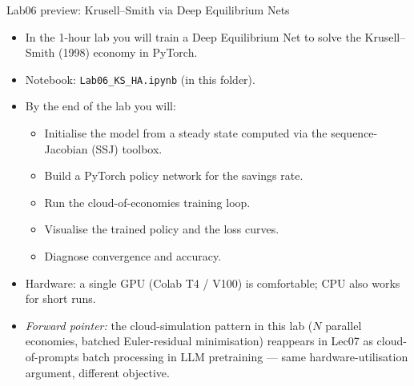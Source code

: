 \begin{frame}{Lab06 preview: Krusell--Smith via Deep Equilibrium Nets}
\begin{itemize}
\item In the 1-hour lab you will train a Deep Equilibrium Net to solve the Krusell--Smith (1998) economy in PyTorch.
\medskip
\item Notebook: \texttt{Lab06\_KS\_HA.ipynb} (in this folder).
\medskip
\item By the end of the lab you will:
  \begin{itemize}
  \item Initialise the model from a steady state computed via the sequence-Jacobian (SSJ) toolbox.
  \item Build a PyTorch policy network for the savings rate.
  \item Run the cloud-of-economies training loop.
  \item Visualise the trained policy and the loss curves.
  \item Diagnose convergence and accuracy.
  \end{itemize}
\medskip
\item Hardware: a single GPU (Colab T4 / V100) is comfortable; CPU also works for short runs.
\medskip
\item \textit{Forward pointer:} the cloud-simulation pattern in this lab ($N$ parallel economies, batched Euler-residual minimisation) reappears in Lec07 as cloud-of-prompts batch processing in LLM pretraining --- same hardware-utilisation argument, different objective.
\end{itemize}
\end{frame}

